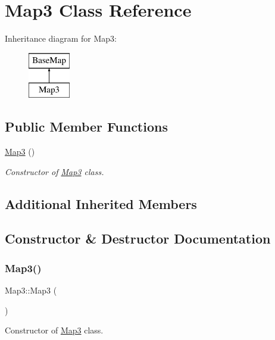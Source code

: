 \hypertarget{class_map3}{}\section{Map3 Class Reference}
\label{class_map3}
Inheritance diagram for Map3\+:\begin{figure}[H]
\begin{center}
\leavevmode
\includegraphics[height=2.000000cm]{class_map3}
\end{center}
\end{figure}
\subsection*{Public Member Functions}
\begin{DoxyCompactItemize}
\item 
\hyperlink{class_map3_a11d68f6bbc7324970f6f433d284711e3}{Map3} ()
\begin{DoxyCompactList}\small\item\em Constructor of \hyperlink{class_map3}{Map3} class. \end{DoxyCompactList}\end{DoxyCompactItemize}
\subsection*{Additional Inherited Members}


\subsection{Constructor \& Destructor Documentation}
\mbox{\label{class_map3_a11d68f6bbc7324970f6f433d284711e3}} 
\subsubsection{\texorpdfstring{Map3()}{Map3()}}
{\footnotesize\ttfamily Map3\+::\+Map3 (\begin{DoxyParamCaption}{ }\end{DoxyParamCaption})}



Constructor of \hyperlink{class_map3}{Map3} class. 



